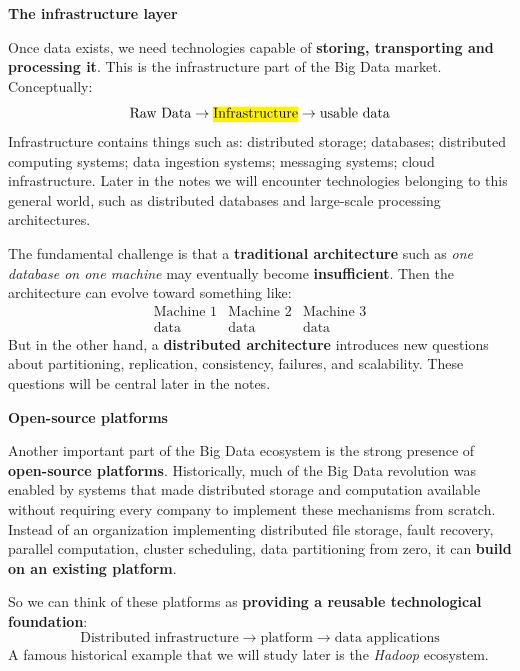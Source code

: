 \highspace
\begin{flushleft}
    \textcolor{Green3}{ \textbf{The infrastructure layer}}
\end{flushleft}
Once data exists, we need technologies capable of \textbf{storing, transporting and processing it}. This is the infrastructure part of the Big Data market. Conceptually:
\begin{equation*}
    \text{Raw Data}
    \rightarrow
    \text{\hl{Infrastructure}}
    \rightarrow
    \text{usable data}
\end{equation*}
Infrastructure contains things such as: distributed storage; databases; distributed computing systems; data ingestion systems; messaging systems; cloud infrastructure. Later in the notes we will encounter technologies belonging to this general world, such as distributed databases and large-scale processing architectures.

\highspace
The fundamental challenge is that a \textbf{traditional architecture} such as \emph{one database on one machine} may eventually become \textbf{insufficient}. Then the architecture can evolve toward something like:
\begin{equation*}
    \begin{array}{ccc}
        \text{Machine 1} & \text{Machine 2} & \text{Machine 3}\\
        \text{data} & \text{data} & \text{data}
    \end{array}
\end{equation*}
But in the other hand, a \textbf{distributed architecture} introduces new questions about partitioning, replication, consistency, failures, and scalability. These questions will be central later in the notes.

\highspace
\begin{flushleft}
    \textcolor{Green3}{ \textbf{Open-source platforms}}
\end{flushleft}
Another important part of the Big Data ecosystem is the strong presence of \textbf{open-source platforms}. Historically, much of the Big Data revolution was enabled by systems that made distributed storage and computation available without requiring every company to implement these mechanisms from scratch. Instead of an organization implementing distributed file storage, fault recovery, parallel computation, cluster scheduling, data partitioning from zero, it can \textbf{build on an existing platform}.

\highspace
So we can think of these platforms as \textbf{providing a reusable technological foundation}:
\begin{equation*}
    \text{Distributed infrastructure}
    \rightarrow
    \text{platform}
    \rightarrow
    \text{data applications}
\end{equation*}
A famous historical example that we will study later is the \emph{Hadoop} ecosystem.

